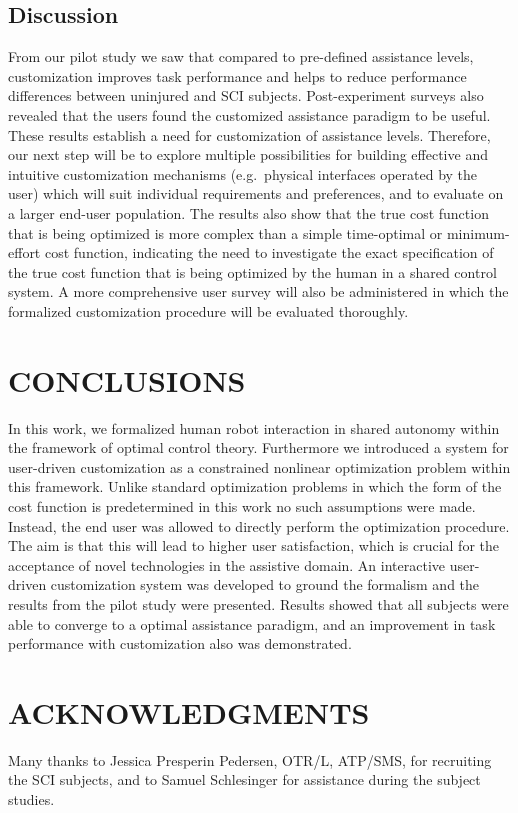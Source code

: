 \documentclass[letterpaper, 10 pt, journal, twoside]{IEEEtran}  %
\begin{document}
	\subsection{Discussion}
	From our pilot study we saw that compared to pre-defined assistance levels, customization improves task performance and helps to reduce performance differences between uninjured and SCI subjects. Post-experiment surveys also revealed that the users found the customized assistance paradigm to be useful. These results establish a need for customization of assistance levels. Therefore, our next step will be to explore multiple possibilities for building effective and intuitive customization mechanisms (e.g.~physical interfaces operated by the user) which will suit individual requirements and preferences, and to evaluate on a larger end-user population. The results also show that the true cost function that is being optimized is more complex than a simple time-optimal or minimum-effort cost function, indicating the need to investigate the exact specification of the true cost function that is being optimized by the human in a shared control system. A more comprehensive user survey will also be administered in which the formalized customization procedure will be evaluated thoroughly.
	\section{CONCLUSIONS}\label{CON}
	In this work, we formalized human robot interaction in shared autonomy within the framework of optimal control theory. Furthermore we introduced a system for user-driven customization as a constrained nonlinear optimization problem within this framework. Unlike standard optimization problems in which the form of the cost function is predetermined in this work no such assumptions were made. Instead, the end user was allowed to directly perform the optimization procedure. The aim is that this will lead to higher user satisfaction, which is crucial for the acceptance of novel technologies in the assistive domain. An interactive user-driven customization system was developed to ground the formalism and the results from the pilot study were presented. Results showed that all subjects were able to converge to a optimal assistance paradigm, and an improvement in task performance with customization also was demonstrated.
	\section*{ACKNOWLEDGMENTS}\label{ACK}
	Many thanks to Jessica Presperin Pedersen, OTR/L,
	ATP/SMS, for recruiting the SCI subjects, and to Samuel
	Schlesinger for assistance during the subject studies.
	
\balance	


\end{document}
